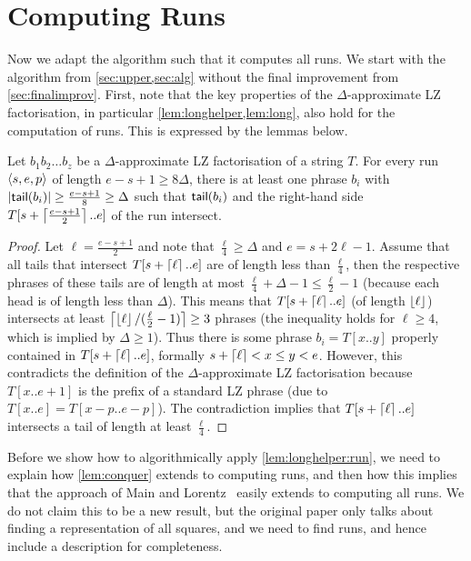 \section{Computing Runs}\label{sec:runs}

Now we adapt the algorithm such that it computes all runs. We start with the algorithm from \cref{sec:upper,sec:alg} without the final improvement from \cref{sec:finalimprov}. First, note that the key properties of the $\Delta$-approximate LZ factorisation, in particular \cref{lem:longhelper,lem:long}, also hold for the computation of runs. This is expressed by the lemmas below.

\begin{lemma}
\label{lem:longhelper:run}
Let $b_{1}b_{2}\ldots b_{z}$ be a $\Delta$-approximate LZ factorisation of a string $T$. For every run $\left\langle s,e,p\right\rangle$ of length $e-s+1 \geq 8\Delta$, there is at least one phrase $b_i$ with $\left\lvert\textsf{tail}(b_i)\right\rvert \geq \frac {e-s+1} 8 \geq \Delta$ such that $\textsf{tail}(b_i)$ and the right-hand side $T[s + \left\lceil\frac{e - s + 1} 2\right\rceil..e]$ of the run intersect.
\end{lemma}
\begin{proof}
Let $\ell = \frac {e-s+1} 2$ and note that $\frac \ell 4 \geq \Delta$ and $e = s+2\ell - 1$. Assume that all tails that intersect $T[s + \left\lceil\ell\right\rceil..e]$ are of length less than $\frac \ell 4$, then the respective phrases of these tails are of length at most $\frac \ell 4 + \Delta - 1 \leq \frac \ell 2 - 1$ (because each head is of length less than $\Delta$). 
This means that $T[s + \left\lceil\ell\right\rceil..e]$ (of length $\left\lfloor\ell\right\rfloor$) intersects at least $\left\lceil\left\lfloor\ell\right\rfloor / (\frac \ell 2 - 1)\right\rceil \geq 3$ phrases (the inequality holds for $\ell \geq 4$, which is implied by $\Delta \geq 1$).
Thus there is some phrase $b_i = T[x..y]$ properly contained in $T[s+\left\lceil\ell\right\rceil..e]$, formally $s+\left\lceil\ell\right\rceil < x \leq y < e$.
However, this contradicts the definition of the $\Delta$-approximate LZ factorisation because $T[x..e+1]$ is the prefix of a standard LZ phrase (due to $T[x..e] = T[x - p..e-p]$). 
The contradiction implies that $T[s+\left\lceil\ell\right\rceil..e]$ intersects a tail of length at least $\frac \ell 4$.
\end{proof}

\noindent Before we show how to algorithmically apply \cref{lem:longhelper:run}, we need to explain how \cref{lem:conquer} extends
to computing runs, and then how this implies that the approach of Main and Lorentz~\cite{Main1984} easily extends to computing all runs.
We do not claim this to be a new result, but the original paper only talks about finding a representation of all squares, and
we need to find runs, and hence include a description for completeness.

